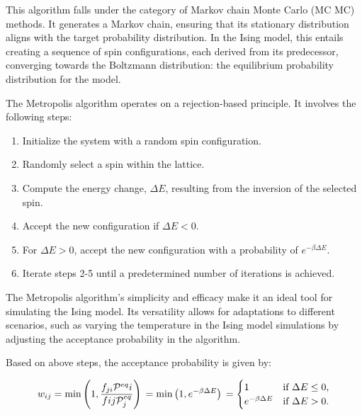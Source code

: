 This algorithm falls under the category of Markov chain Monte Carlo (MC MC)
\cite{Brooks1998} methods. It generates a Markov chain, ensuring that its
stationary distribution aligns with the target probability distribution. In the
Ising model, this entails creating a sequence of spin configurations, each
derived from its predecessor, converging towards the Boltzmann distribution: the
equilibrium probability distribution for the model.

The Metropolis algorithm operates on a rejection-based principle. It involves
the following steps:

\begin{enumerate}
\item Initialize the system with a random spin configuration.
\item Randomly select a spin within the lattice.
\item Compute the energy change, $\Delta E$, resulting from the inversion of the
selected spin.
\item Accept the new configuration if $\Delta E < 0$.
\item For $\Delta E > 0$, accept the new configuration with a probability of
$e^{-\beta \Delta E}$.
\item Iterate steps 2-5 until a predetermined number of iterations is achieved.
\end{enumerate}

The Metropolis algorithm's simplicity and efficacy make it an ideal tool for
simulating the Ising model. Its versatility allows for adaptations to different
scenarios, such as varying the temperature in the Ising model simulations by
adjusting the acceptance probability in the algorithm.

Based on above steps, the acceptance probability is given by:

\begin{equation}
    w_{ij} = \min \left( 1, \frac{f_{ji} \mathcal{P}^{eq}i}{f{ij} \mathcal{P}^{eq}_j} \right) \\
    = \min \left( 1, e^{-\beta \Delta E} \right) \\
    =
    \begin{cases}
        1 & \text{if } \Delta E \leq 0, \\
        e^{-\beta \Delta E} & \text{if } \Delta E > 0.
    \end{cases}
\end{equation}

